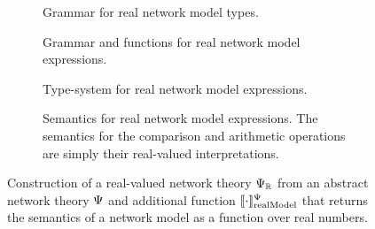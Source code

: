\begin{figure}[t]
    \newcommand{\realParam}{\hspace{-0.25em}$^\real$}
    \centering
	\begin{subfigure}{\textwidth}
		
        \vspace{-0.75em}
		\caption{Grammar for real network model types.}
		\label{fig:real-theory-type-syntax}
	\end{subfigure}
    \vspace{0.5em}

    \begin{subfigure}{\textwidth}
		
        \vspace{-0.55em}
		\caption{Grammar and functions for real network model expressions.}
		\label{fig:real-theory-expr-syntax}
	\end{subfigure}
    
    \begin{subfigure}{\textwidth}
		
		\caption{Type-system for real network model expressions.}
		\label{fig:real-theory-grammar}
	\end{subfigure}
    \vspace{0.5em}
    
    \begin{subfigure}{\textwidth}
		
		\caption{Semantics for real network model expressions. The semantics for the comparison and arithmetic operations are simply their real-valued interpretations.}
		\label{fig:real-theory-semantics}
	\end{subfigure}
    \caption{Construction of a real-valued network theory $\Psi_{\mathbb{R}}$ from an abstract network theory $\Psi$ and additional function $\llbracket \cdot \rrbracket_\text{realModel}^\Psi$ that returns the semantics of a network model as a function over real numbers.}
    \label{fig:real-network-theory}
\end{figure}

